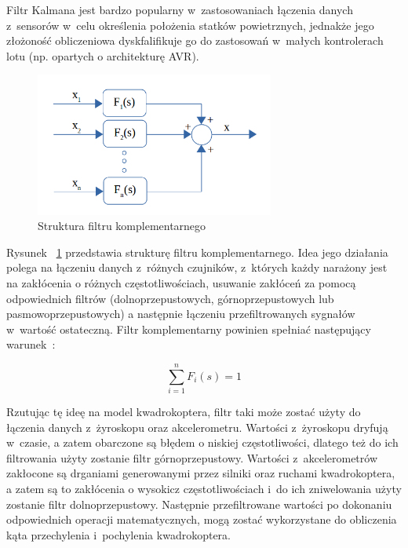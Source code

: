 \documentclass[11pt, twoside]{Thesis} %
\begin{document}
Filtr Kalmana jest bardzo popularny w~zastosowaniach łączenia danych z~sensorów w~celu określenia położenia statków powietrznych, jednakże jego złożoność obliczeniowa dyskfalifikuje go do zastosowań w~małych kontrolerach lotu (np. opartych o architekturę AVR).

\begin{figure}[H]
	\centering
	\includegraphics[width=0.7\textwidth]{Pictures/complementary_filter_general.png}
		\caption[Struktura filtru komplementarnego]{Struktura filtru komplementarnego~\cite{filters2}}
	\label{fig:complementary_filter_general}
\end{figure}

Rysunek ~\ref{fig:complementary_filter_general} przedstawia strukturę filtru komplementarnego. Idea jego działania polega na łączeniu danych z~różnych czujników, z~których każdy narażony jest na zakłócenia o różnych częstotliwościach, usuwanie zakłóceń za pomocą odpowiednich filtrów (dolnoprzepustowych, górnoprzepustowych lub pasmowoprzepustowych) a następnie łączeniu przefiltrowanych sygnałów w~wartość ostateczną. Filtr komplementarny powinien spełniać następujący warunek~\cite{filters2}:

\begin{equation}
	\sum_{i=1}^{n}F_{i}(s) = 1
\end{equation}

Rzutując tę ideę na model kwadrokoptera, filtr taki może zostać użyty do łączenia danych z~żyroskopu oraz akcelerometru. Wartości z~żyroskopu dryfują w~czasie, a zatem obarczone są błędem o niskiej częstotliwości, dlatego też do ich filtrowania użyty zostanie filtr górnoprzepustowy. Wartości z~akcelerometrów zakłocone są drganiami generowanymi przez silniki oraz ruchami kwadrokoptera, a zatem są to zakłócenia o wysokicz częstotliwościach i~do ich zniwelowania użyty zostanie filtr dolnoprzepustowy. Następnie przefiltrowane wartości po dokonaniu odpowiednich operacji matematycznych, mogą zostać wykorzystane do obliczenia kąta przechylenia i~pochylenia kwadrokoptera.
\end{document}
